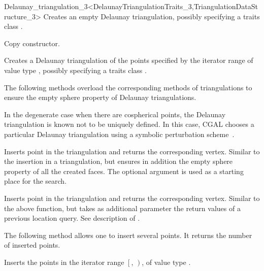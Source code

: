 \begin{ccRefClass}{Delaunay_triangulation_3<DelaunayTriangulationTraits_3,TriangulationDataStructure_3>}
{Creates an empty Delaunay triangulation, possibly specifying a traits class
.}

{Copy constructor.}

{Creates a Delaunay triangulation of the points specified by the iterator range
\ccc{[first,last)} of value type , possibly specifying a traits
class .}

\ccOperations


The following methods overload the corresponding methods of
triangulations to ensure the empty sphere property of Delaunay 
triangulations.

In the degenerate case when there are cospherical points, the Delaunay
triangulation is known not to be uniquely defined. In this case, CGAL
chooses a particular Delaunay triangulation using a symbolic perturbation
scheme~\cite{dt-pvr3d-03}.


{Inserts point  in the triangulation and returns the corresponding
 vertex. Similar to the insertion in a triangulation, but ensures in
addition the empty sphere property of all the created faces.
The optional argument  is used as a starting place for the search.}

{Inserts point  in the triangulation and returns the corresponding
 vertex. Similar to the above  function, but takes as additional
 parameter the return values of a previous location query.  See description of
 .}

The following method allows one to insert several points. It returns the
number of inserted points. 

{Inserts the points in the iterator range $\left[\right.$,
$\left.\right)$, of value type .}


\end{ccRefClass}
